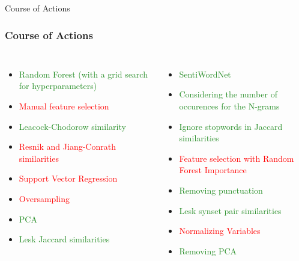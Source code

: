 \documentclass[usenames,dvipsnames]{beamer}
\begin{document}
\begin{frame}{Course of Actions}
    \frametitle{Course of Actions}
    \begin{columns}
        \begin{itemize}
            \item \textcolor{ForestGreen}{Random Forest (with a grid search for hyperparameters)}
            \pause
            \item \textcolor{red}{Manual feature selection}
            \pause
            \item \textcolor{ForestGreen}{Leacock-Chodorow similarity}
            \pause
            \item \textcolor{red}{Resnik and Jiang-Conrath similarities}
            \pause
            \item \textcolor{red}{Support Vector Regression}
            \pause
            \item \textcolor{red}{Oversampling}
            \pause
            \item \textcolor{ForestGreen}{PCA}
            \pause
            \item \textcolor{ForestGreen}{Lesk Jaccard similarities}
            \pause
        \end{itemize}   
        \begin{itemize}
            \item \textcolor{ForestGreen}{SentiWordNet}
            \pause
            \item \textcolor{ForestGreen}{Considering the number of occurences for the N-grams}
            \pause
            \item \textcolor{ForestGreen}{Ignore stopwords in Jaccard similarities}
            \pause
            \item \textcolor{red}{Feature selection with Random Forest Importance}
            \pause
            \item \textcolor{ForestGreen}{Removing punctuation}
            \pause
            \item \textcolor{ForestGreen}{Lesk synset pair similarities}
            \pause
            \item \textcolor{red}{Normalizing Variables}
            \pause
            \item \textcolor{ForestGreen}{Removing PCA}
        \end{itemize}
    \end{columns}
\end{frame}
\end{document}
